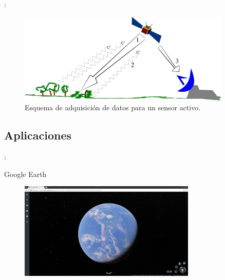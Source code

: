 \documentclass[aspectratio=169]{beamer}
\begin{document}
\begin{frame}{\secname : \subsecname}
    \begin{figure}[h!]
        \centering
        \includegraphics[width=0.9\textwidth]{fig:activo.png}
        \caption{Esquema de adquisición de datos para un sensor activo. \cite{wiki:rs}}
        \label{fig:activo}
    \end{figure}
\end{frame}

\subsection{Aplicaciones}

\begin{frame}{\secname : \subsecname}
    \begin{exampleblock}{Google Earth}
        \begin{figure}[h!]
            \centering
            \includegraphics[width=0.75\textwidth]{fig:GE.png}
            \label{fig:GE}
        \end{figure}
    \end{exampleblock}
\end{frame}
\end{document}

